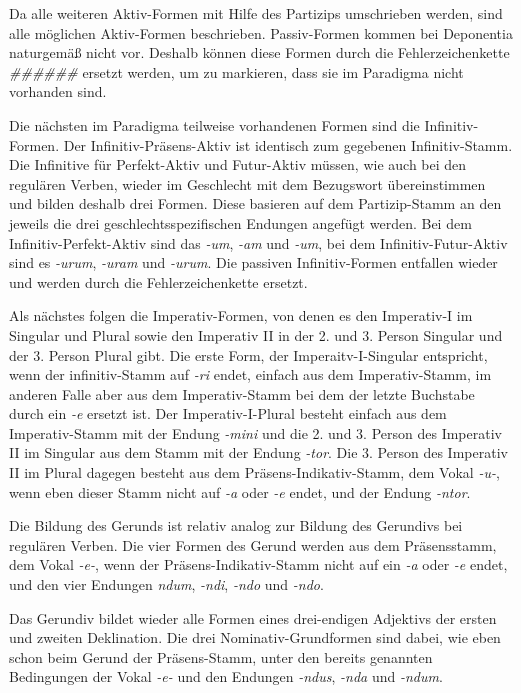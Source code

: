 \documentclass[12pt,abstract=on,titlepage,bibliography=totoc,ngerman,listof=totoc]{scrreprt}
\begin{document}
Da alle weiteren Aktiv-Formen mit Hilfe des Partizips umschrieben werden, sind alle möglichen Aktiv-Formen beschrieben. Passiv-Formen kommen bei Deponentia naturgemäß nicht vor. Deshalb können diese Formen durch die Fehlerzeichenkette \textit{\#\#\#\#\#\#} ersetzt werden, um zu markieren, dass sie im Paradigma nicht vorhanden sind. \par
Die nächsten im Paradigma teilweise vorhandenen Formen sind die Infinitiv-Formen. Der Infinitiv-Präsens-Aktiv ist identisch zum gegebenen Infinitiv-Stamm. Die Infinitive für Perfekt-Aktiv und Futur-Aktiv müssen, wie auch bei den regulären Verben, wieder im Geschlecht mit dem Bezugswort übereinstimmen und bilden deshalb drei Formen. Diese basieren auf dem Partizip-Stamm an den jeweils die drei geschlechtsspezifischen Endungen angefügt werden. Bei dem Infinitiv-Perfekt-Aktiv sind das \textit{-um}, \textit{-am} und \textit{-um}, bei dem Infinitiv-Futur-Aktiv sind es \textit{-urum}, \textit{-uram} und \textit{-urum}. Die passiven Infinitiv-Formen entfallen wieder und werden durch die Fehlerzeichenkette ersetzt. \par
Als nächstes folgen die Imperativ-Formen, von denen es den Imperativ-I im Singular und Plural sowie den Imperativ II in der 2. und 3. Person Singular und der 3. Person Plural gibt. Die erste Form, der Imperaitv-I-Singular entspricht, wenn der infinitiv-Stamm auf \textit{-ri} endet, einfach aus dem Imperativ-Stamm, im anderen Falle aber aus dem Imperativ-Stamm bei dem der letzte Buchstabe durch ein \textit{-e} ersetzt ist. Der Imperativ-I-Plural besteht einfach aus dem Imperativ-Stamm mit der Endung \textit{-mini} und die 2. und 3. Person des Imperativ II im Singular aus dem Stamm mit der Endung \textit{-tor}. Die 3. Person des Imperativ II im Plural dagegen besteht aus dem Präsens-Indikativ-Stamm, dem Vokal \textit{-u-}, wenn eben dieser Stamm nicht auf \textit{-a} oder \textit{-e} endet, und der Endung \textit{-ntor}. \par
Die Bildung des Gerunds ist relativ analog zur Bildung des Gerundivs bei regulären Verben. Die vier Formen des Gerund werden aus dem Präsensstamm, dem Vokal \textit{-e-}, wenn der Präsens-Indikativ-Stamm nicht auf ein \textit{-a} oder \textit{-e} endet, und den vier Endungen \textit{ndum}, \textit{-ndi}, \textit{-ndo} und \textit{-ndo}. \par
Das Gerundiv bildet wieder alle Formen eines drei-endigen Adjektivs der ersten und zweiten Deklination. Die drei Nominativ-Grundformen sind dabei, wie eben schon beim Gerund der Präsens-Stamm, unter den bereits genannten Bedingungen der Vokal \textit{-e-} und den Endungen \textit{-ndus}, \textit{-nda} und \textit{-ndum}. \par
\end{document}
